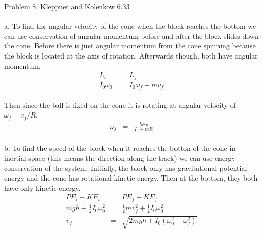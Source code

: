 \documentclass[11pt]{amsart}
\begin{document}
Problem 8. Kleppner and Kolenkow 6.33 \\ \\
a. To find the angular velocity of the cone when the block reaches the bottom we can use conservation of angular momentum before and after the block slides down the cone. Before there is just angular momentum from the cone spinning because the block is located at the axis of rotation. Afterwards though, both have angular momentum. \\
\begin{eqnarray*} 
L_{i} &=& L_{f} \\
I_{0}\omega_{0} &=& I_{0}\omega_{f}+mv_{f} 
\end{eqnarray*} \\
Then since the ball is fixed on the cone it is rotating at angular velocity of $\omega_{f}=v_{f}/R$. \\
\begin{eqnarray*}
\omega_{f} &=& \frac{I_{0}\omega_{0}}{I_{0}+mR} 
\end{eqnarray*} \\
b. To find the speed of the block when it reaches the botton of the cone in inertial space (this means the direction along the track) we can use energy conservation of the system. Initially, the block only has gravitational potential energy and the cone has rotational kinetic energy. Then at the bottom, they both have only kinetic energy.  \\
\begin{eqnarray*}
PE_{i}+KE_{i} &=& PE_{f} +KE_{f} \\
mgh +\frac{1}{2}I_{0}\omega_{0}^{2} &=& \frac{1}{2}mv_{f}^{2} +\frac{1}{2}I_{0}\omega_{0}^{2} \\
v_{f} &=& \sqrt{2mgh+I_{0}(\omega_{0}^{2}-\omega_{f}^{2})} 
\end{eqnarray*} \\
\end{document}
